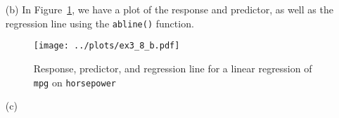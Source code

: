 \begin{itemize}
\begin{itemize}
\begin{verbatim}
1 24.46708 23.97308 24.96108
                \end{verbatim}\normalsize
                from which we conclude that the associated 95\% confidence interval
                is [23.97308, 24.96108] for a predicted value of 24.46708.
                For the prediction interval, we have
                \scriptsize\begin{verbatim}
> predict(lm.fit, data.frame(horsepower = 98), interval = "prediction")
       fit     lwr      upr
1 24.46708 14.8094 34.12476
                \end{verbatim}\normalsize
                so that the interval is [14.8094, 34.12476] for the same predicted
                value.
        \end{itemize}
    \item[(b)] In Figure~\ref{fig9}, we have a plot of the response and predictor,
        as well as the regression line using the \verb|abline()| function.
    \begin{figure}[!ht]
        \texttt{[image: ../plots/ex3\_8\_b.pdf]}
        \caption{Response, predictor, and regression line for a linear regression
        of \\ \texttt{mpg} on \texttt{horsepower}\label{fig9}}
    \end{figure}
    \item[(c)] 
\end{itemize}
